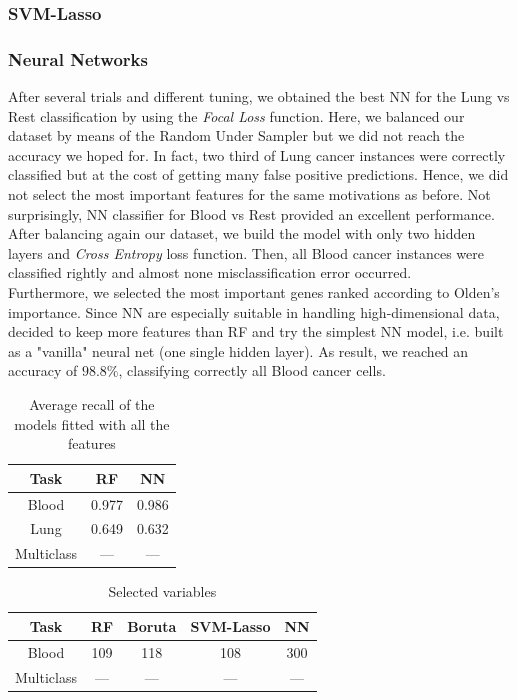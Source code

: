 \documentclass[a4paper,11pt, oneside]{article}  %
\begin{document}
\subsubsection{SVM-Lasso}


\subsubsection{Neural Networks}
After several trials and different tuning, we obtained the best NN for the Lung vs Rest classification by using the \textit{Focal Loss} function. Here, we balanced our dataset by means of the Random Under Sampler but we did not reach the accuracy we hoped for. In fact, two third of Lung cancer instances were correctly classified but at the cost of getting many false positive predictions. Hence, we did not select the most important features for the same motivations as before. 
Not surprisingly, NN classifier for Blood vs Rest provided an excellent performance. After balancing again our dataset, we build the model with only two hidden layers and \textit{Cross Entropy} loss function. Then, all Blood cancer instances were classified rightly and almost none misclassification error occurred. \\
Furthermore, we selected the most important genes ranked according to Olden's importance. Since NN are especially suitable in handling high-dimensional data, decided to keep more features than RF and try the simplest NN model, i.e. built as a "vanilla" neural net (one single hidden layer). As result, we reached an accuracy of $98.8\%$, classifying correctly all Blood cancer cells.







\begin{table}[h!]
	\caption{Average recall of the models fitted with all the features}
	\centering
	\begin{tabular}{c c c}
		\hline\hline
		Task & RF & NN \\ [0.5ex] %
		\hline
		Blood & 0.977  & 0.986 \\
		Lung & 0.649  & 0.632 \\
		Multiclass & --- & --- \\ [1ex]
		\hline
	\end{tabular}
	\label{table:big_models}
\end{table}

\begin{table}[h!]
	\caption{Selected variables}
	\centering
	\begin{tabular}{c c c c c}
		\hline\hline
		Task & RF & Boruta & SVM-Lasso & NN \\ [0.5ex] %
		\hline
		Blood & 109 & 118 & 108 & 300 \\
		Multiclass & --- &  --- & --- & --- \\ [1ex]
		\hline
	\end{tabular}
	\label{table:selected variables}
\end{table}
\end{document}
